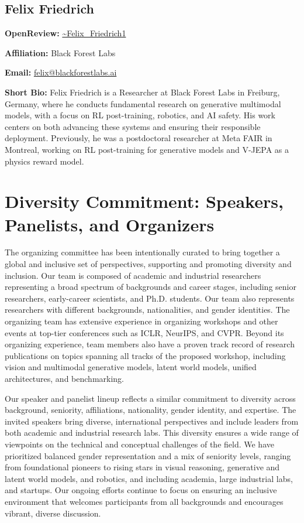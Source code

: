 \documentclass[11pt]{article}
\begin{document}
\subsection{Felix Friedrich}

\textbf{OpenReview:} \href{https://openreview.net/profile?id=\string~Felix\_Friedrich1}{\textasciitilde{}Felix\_Friedrich1}


\textbf{Affiliation:} Black Forest Labs


\textbf{Email:} \href{mailto:felix@blackforestlabs.ai}{felix@blackforestlabs.ai}


\textbf{Short Bio:} Felix Friedrich is a Researcher at Black Forest Labs in Freiburg, Germany, where he conducts fundamental research on generative multimodal models, with a focus on RL post-training, robotics, and AI safety. His work centers on both advancing these systems and ensuring their responsible deployment. Previously, he was a postdoctoral researcher at Meta FAIR in Montreal, working on RL post-training for generative models and V-JEPA as a physics reward model.


\section{Diversity Commitment: Speakers, Panelists, and Organizers}

The organizing committee has been intentionally curated to bring together a global and inclusive set of perspectives, supporting and promoting diversity and inclusion. Our team is composed of academic and industrial researchers representing a broad spectrum of backgrounds and career stages, including senior researchers, early-career scientists, and Ph.D. students. Our team also represents researchers with different backgrounds, nationalities, and gender identities. The organizing team has extensive experience in organizing workshops and other events at top-tier conferences such as ICLR, NeurIPS, and CVPR. Beyond its organizing experience, team members also have a proven track record of research publications on topics spanning all tracks of the proposed workshop, including vision and multimodal generative models, latent world models, unified architectures, and benchmarking.


Our speaker and panelist lineup reflects a similar commitment to diversity across background, seniority, affiliations, nationality, gender identity, and expertise. The invited speakers bring diverse, international perspectives and include leaders from both academic and industrial research labs. This diversity ensures a wide range of viewpoints on the technical and conceptual challenges of the field. We have prioritized balanced gender representation and a mix of seniority levels, ranging from foundational pioneers to rising stars in visual reasoning, generative and latent world models, and robotics, and including academia, large industrial labs, and startups. Our ongoing efforts continue to focus on ensuring an inclusive environment that welcomes participants from all backgrounds and encourages vibrant, diverse discussion.
\end{document}
